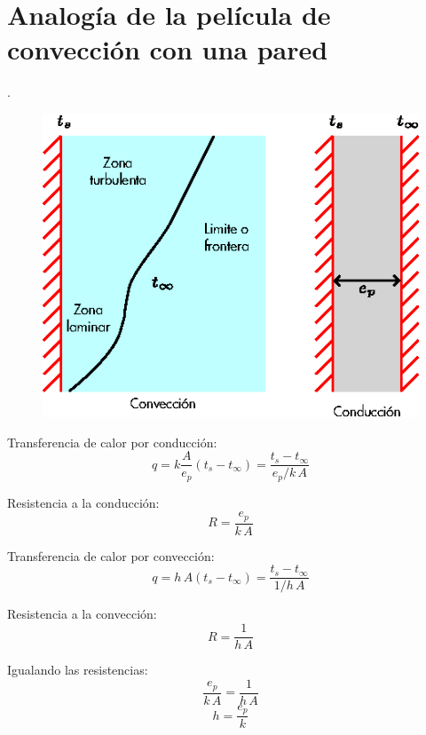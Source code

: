 \section{Analogía de la película de convección con una pared}.
\begin{figure}[!h]
\centering
\includegraphics[scale=1.40]{figura04_02.eps}
\end{figure}

Transferencia de calor por conducción:
\begin{equation*}
    q = k\frac{A}{e_p}(t_s-t_\infty)=\frac{t_s-t_\infty}{e_p/k\,A}
\end{equation*}

Resistencia a la conducción:
\begin{equation*}
    R = \frac{e_p}{k\,A}
\end{equation*}

Transferencia de calor por convección:
\begin{equation*}
    q = h\,A(t_s-t_\infty)=\frac{t_s-t_\infty}{1/h\,A}
\end{equation*}

Resistencia a la convección:
\begin{equation*}
    R = \frac{1}{h\,A}
\end{equation*}

Igualando las resistencias:
\begin{equation*}
    \frac{e_p}{k\,A} = \frac{1}{h\,A}
\end{equation*}
\begin{equation*}
    h = \frac{e_p}{k}
\end{equation*}

